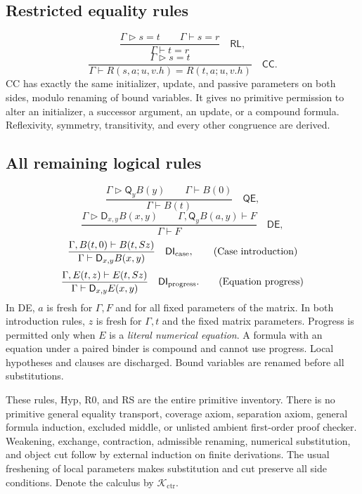 \documentclass[11pt,letterpaper]{article}
\theoremstyle{definition}\newtheorem{definition}[theorem]{Definition}
\theoremstyle{remark}\newtheorem{remark}[theorem]{Remark}
\newcommand{\Acal}{\mathcal K_{\mathrm{ctr}}}
\newcommand{\D}{\ensuremath{\mathsf D}}
\newcommand{\Q}{\ensuremath{\mathsf Q}}
\newcommand{\av}{\mathrel{\triangleright}}
\begin{document}
\subsection{Restricted equality rules}

\[
 \frac{\Gamma\av s=t\qquad\Gamma\vdash s=r}
      {\Gamma\vdash t=r}
 \quad\mathsf{RL},
 \tag{Root replacement}\label{rule:RL}
\]
\[
 \frac{\Gamma\av s=t}
      {\Gamma\vdash R(s,a;u,v.h)=R(t,a;u,v.h)}
 \quad\mathsf{CC}.
 \tag{Counter congruence}\label{rule:CC}
\]
CC has exactly the same initializer, update, and passive parameters on
both sides, modulo renaming of bound variables. It gives no primitive
permission to alter an initializer, a successor argument, an update,
or a compound formula. Reflexivity, symmetry, transitivity, and every
other congruence are derived.

\subsection{All remaining logical rules}

\[
 \frac{\Gamma\av\Q_yB(y)\qquad\Gamma\vdash B(0)}
      {\Gamma\vdash B(t)}\quad\mathsf{QE},
 \tag{Closure use}\label{rule:QE}
\]
\[
 \frac{\Gamma\av\D_{x,y}B(x,y)\qquad
       \Gamma,\Q_yB(a,y)\vdash F}
      {\Gamma\vdash F}\quad\mathsf{DE},
 \tag{Paired elimination}\label{rule:DE}
\]
\[
 \frac{\Gamma,B(t,0)\vdash B(t,Sz)}
      {\Gamma\vdash\D_{x,y}B(x,y)}\quad\mathsf{DI}_{\rm case},
 \tag{Case introduction}\label{rule:DIcase}
\]
\[
 \frac{\Gamma,E(t,z)\vdash E(t,Sz)}
      {\Gamma\vdash\D_{x,y}E(x,y)}\quad\mathsf{DI}_{\rm progress}.
 \tag{Equation progress}\label{rule:DIprogress}
\]
In DE, $a$ is fresh for $\Gamma,F$ and for all fixed parameters of the
matrix. In both introduction rules, $z$ is fresh for $\Gamma,t$ and
the fixed matrix parameters. Progress is permitted only when $E$ is
a \emph{literal numerical equation}. A formula with an equation under
a paired binder is compound and cannot use progress. Local hypotheses
and clauses are discharged. Bound variables are renamed before all
substitutions.

These rules, Hyp, R0, and RS are the entire primitive inventory. There
is no primitive general equality transport, coverage axiom, separation
axiom, general formula induction, excluded middle, or unlisted ambient
first-order proof checker. Weakening, exchange, contraction, admissible
renaming, numerical substitution, and object cut follow by external
induction on finite derivations. The usual freshening of local
parameters makes substitution and cut preserve all side conditions.
Denote the calculus by $\Acal$.
\end{document}
